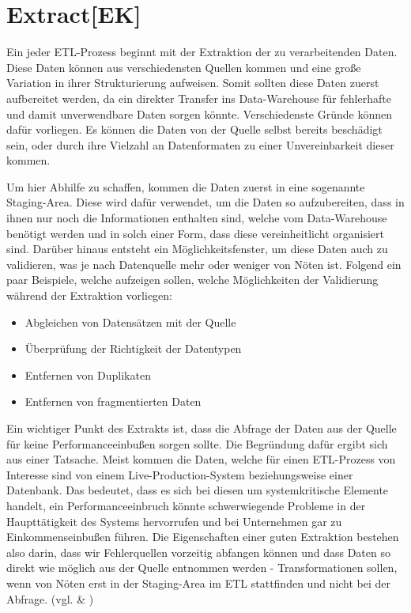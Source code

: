 \section{Extract[EK]}\label{sec:extract}
Ein jeder ETL-Prozess beginnt mit der Extraktion der zu verarbeitenden Daten. Diese Daten können aus verschiedensten Quellen kommen und eine große Variation in ihrer Strukturierung aufweisen. Somit sollten diese Daten zuerst aufbereitet werden, da ein direkter Transfer ins Data-Warehouse für fehlerhafte und damit unverwendbare Daten sorgen könnte. Verschiedenste Gründe können dafür vorliegen. Es können die Daten von der Quelle selbst bereits beschädigt sein, oder durch ihre Vielzahl an Datenformaten zu einer Unvereinbarkeit dieser kommen.
\vspace{5mm}\par
Um hier Abhilfe zu schaffen, kommen die Daten zuerst in eine sogenannte Staging-Area. Diese wird dafür verwendet, um die Daten so aufzubereiten, dass in ihnen nur noch die Informationen enthalten sind, welche vom Data-Warehouse benötigt werden und in solch einer Form, dass diese vereinheitlicht organisiert sind. Darüber hinaus entsteht ein Möglichkeitsfenster, um diese Daten auch zu validieren, was je nach Datenquelle mehr oder weniger von Nöten ist. Folgend ein paar Beispiele, welche aufzeigen sollen, welche Möglichkeiten der Validierung während der Extraktion vorliegen:
\begin{itemize}
  \item Abgleichen von Datensätzen mit der Quelle
  \item Überprüfung der Richtigkeit der Datentypen
  \item Entfernen von Duplikaten
  \item Entfernen von fragmentierten Daten
\end{itemize}
Ein wichtiger Punkt des Extrakts ist, dass die Abfrage der Daten aus der Quelle für keine Performanceeinbußen sorgen sollte. Die Begründung dafür ergibt sich aus einer Tatsache. Meist kommen die Daten, welche für einen ETL-Prozess von Interesse sind von einem Live-Production-System beziehungsweise einer Datenbank. Das bedeutet, dass es sich bei diesen um systemkritische Elemente handelt, ein Performanceeinbruch könnte schwerwiegende Probleme in der Haupttätigkeit des Systems hervorrufen und bei Unternehmen gar zu Einkommenseinbußen führen. Die Eigenschaften einer guten Extraktion bestehen also darin, dass wir Fehlerquellen vorzeitig abfangen können und dass Daten so direkt wie möglich aus der Quelle entnommen werden - Transformationen sollen, wenn von Nöten erst in der Staging-Area im ETL stattfinden und nicht bei der Abfrage.
(vgl. \cite{ETL-Process} \& \cite{ETL-Explained})